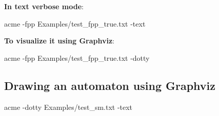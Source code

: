 \documentclass[11pt]{llncs}
\begin{document}
\noindent\textbf{In text verbose mode}:
\begin{center}acme -fpp Examples/test\_fpp\_true.txt -text\end{center}

\noindent\textbf{To visualize it using Graphviz}:
\begin{center}acme -fpp Examples/test\_fpp\_true.txt -dotty\end{center}

\subsection{Drawing an automaton using Graphviz}

\begin{center}acme -dotty Examples/test\_sm.txt -text\end{center}

%
%
\end{document}
